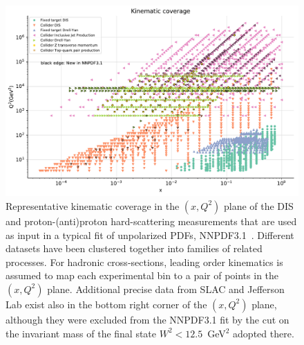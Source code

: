 \begin{figure}[!t]
\centering
\includegraphics[scale=0.60]{plots/kinplot-report.pdf}
\caption{\small Representative kinematic coverage in the $(x,Q^2)$ plane
 of the DIS and proton-(anti)proton hard-scattering measurements that are
 used as input in a typical fit of unpolarized PDFs, 
 NNPDF3.1~\cite{Ball:2017nwa}.
 Different datasets have been clustered together into families of
 related processes.
 For hadronic cross-sections, leading order kinematics is assumed to map
 each experimental bin to a pair of points in the $(x,Q^2)$ plane.
 Additional precise data from SLAC and Jefferson Lab exist also in the 
 bottom right corner of the $(x,Q^2)$ plane, although they were excluded from 
 the NNPDF3.1 fit by the cut on the invariant mass of the final 
 state $W^2<12.5$~GeV$^2$ adopted there.}
\label{fig:kinplot-report} 
\end{figure}

